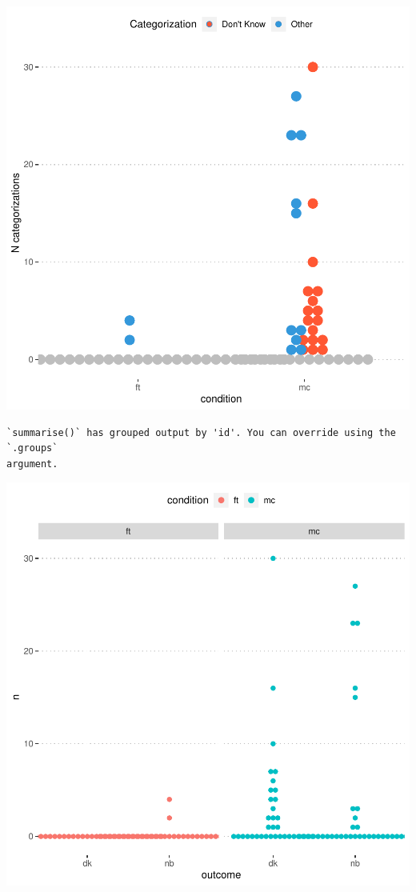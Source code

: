 \documentclass[
  man,
  longtable,
  nolmodern,
  notxfonts,
  notimes,
  colorlinks=true,linkcolor=blue,citecolor=blue,urlcolor=blue]{apa7}
\begin{document}
\includegraphics{quarto_test_files/figure-pdf/label - fig-descriptives-nbofig.cap- Responses of other and I don't know across the multiple categories and free text condiitons-1.pdf}

\begin{verbatim}
`summarise()` has grouped output by 'id'. You can override using the `.groups`
argument.
\end{verbatim}

\includegraphics{quarto_test_files/figure-pdf/unnamed-chunk-10-1.pdf}
\end{document}
